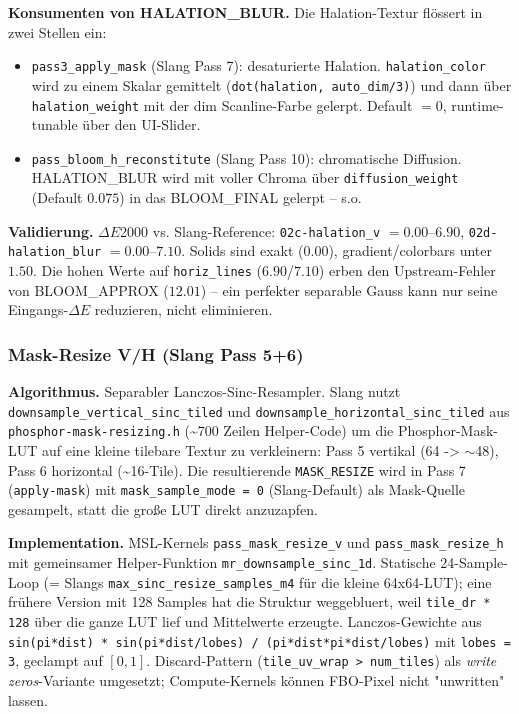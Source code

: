 \documentclass[11pt, a4paper]{article}
\begin{document}
\vspace{.5cm}
\textbf{Konsumenten von HALATION\_BLUR.} Die Halation-Textur fl\"ossert in zwei Stellen ein:
\begin{itemize}[leftmargin=*]
    \item \texttt{pass3\_apply\_mask} (Slang Pass 7): desaturierte Halation. \texttt{halation\_color} wird zu einem Skalar gemittelt (\texttt{dot(halation, auto\_dim/3)}) und dann \"uber \texttt{halation\_weight} mit der dim Scanline-Farbe gelerpt. Default $= 0$, runtime-tunable \"uber den UI-Slider.
    \item \texttt{pass\_bloom\_h\_reconstitute} (Slang Pass 10): chromatische Diffusion. HALATION\_BLUR wird mit voller Chroma \"uber \texttt{diffusion\_weight} (Default $0.075$) in das BLOOM\_FINAL gelerpt -- s.o.
\end{itemize}

\vspace{.5cm}
\textbf{Validierung.} $\Delta E$2000 vs. Slang-Reference: \texttt{02c-halation\_v} $= 0.00$--$6.90$, \texttt{02d-halation\_blur} $= 0.00$--$7.10$. Solids sind exakt ($0.00$), gradient/colorbars unter $1.50$. Die hohen Werte auf \texttt{horiz\_lines} ($6.90$/$7.10$) erben den Upstream-Fehler von BLOOM\_APPROX ($12.01$) -- ein perfekter separable Gauss kann nur seine Eingangs-$\Delta E$ reduzieren, nicht eliminieren.

\vspace{.5cm}
\subsubsection*{Mask-Resize V/H (Slang Pass 5+6)}
\textbf{Algorithmus.} Separabler Lanczos-Sinc-Resampler. Slang nutzt \texttt{downsample\_vertical\_sinc\_tiled} und \texttt{downsample\_horizontal\_sinc\_tiled} aus \texttt{phosphor-mask-resizing.h} (\textasciitilde 700 Zeilen Helper-Code) um die Phosphor-Mask-LUT auf eine kleine tilebare Textur zu verkleinern: Pass 5 vertikal (64 -> $\sim$48), Pass 6 horizontal (\textasciitilde 16-Tile). Die resultierende \texttt{MASK\_RESIZE} wird in Pass 7 (\texttt{apply-mask}) mit \texttt{mask\_sample\_mode = 0} (Slang-Default) als Mask-Quelle gesampelt, statt die gro{\ss}e LUT direkt anzuzapfen.

\vspace{.5cm}
\textbf{Implementation.} MSL-Kernels \texttt{pass\_mask\_resize\_v} und \texttt{pass\_mask\_resize\_h} mit gemeinsamer Helper-Funktion \texttt{mr\_downsample\_sinc\_1d}. Statische 24-Sample-Loop (= Slangs \texttt{max\_sinc\_resize\_samples\_m4} f\"ur die kleine 64x64-LUT); eine fr\"uhere Version mit 128 Samples hat die Struktur weggebluert, weil \texttt{tile\_dr * 128} \"uber die ganze LUT lief und Mittelwerte erzeugte. Lanczos-Gewichte aus \texttt{sin(pi*dist) * sin(pi*dist/lobes) / (pi*dist*pi*dist/lobes)} mit \texttt{lobes = 3}, geclampt auf $[0, 1]$. Discard-Pattern (\texttt{tile\_uv\_wrap > num\_tiles}) als \emph{write zeros}-Variante umgesetzt; Compute-Kernels k\"onnen FBO-Pixel nicht "unwritten" lassen.
\end{document}
